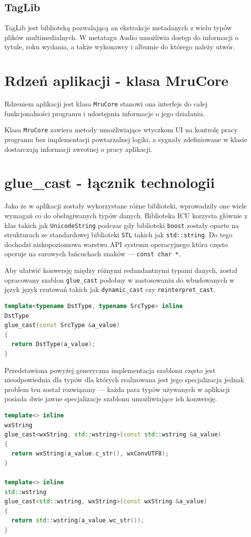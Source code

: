 \subsection{TagLib}
TagLib jest biblioteką pozwalającą an ekstrakcje metadanych z wielu typów plików multimedialnych. W metatagu Audio umożliwia dostęp do informacji o tytule, roku wydania, a także wykonawcy i albumie do którego należy utwór.

\section{Rdzeń aplikacji - klasa MruCore}
Rdzeniem aplikacji jest klasa \texttt{MruCore} stanowi ona interfejs do całej funkcjonalności programu i udostępnia informacje o jego działaniu.
\par
Klasa \texttt{MruCore} zawiera metody umożliwiające wtyczkom UI na kontrolę pracy programu bez implementacji powtarzalnej logiki, a sygnały zdefiniowane w klasie dostarczają informacji zwrotnej o pracy aplikacji.

\section{glue\_cast - łącznik technologii}
Jako że w aplikacji zostały wykorzystane różne biblioteki, wprowadziły one wiele wymagań co do obsługiwanych typów danych.
Biblioteka ICU korzysta głównie z klas takich jak \texttt{UnicodeString} podczas gdy biblioteki \texttt{boost} zostały oparte na strukturach ze standardowej biblioteki \texttt{STL} takich jak \texttt{std::string}. Do tego dochodzi niskopoziomowa warstwa API systemu operacyjnego która często operuje na surowych łańcuchach znaków --- \texttt{const char *}.
\par
Aby ułatwić konwersję między różnymi redundantnymi typami danych, został opracowany szablon \texttt{glue\_cast} podobny w zastosowaniu do wbudowanych w język język rzutowań takich jak \texttt{dynamic\_cast} czy \texttt{reinterpret\_cast}.

\begin{lstlisting}[caption={ glue.hpp}, language=C++]
template<typename DstType, typename SrcType> inline
DstType
glue_cast(const SrcType &a_value)
{
  return DstType(a_value);
}
\end{lstlisting}

\par
Przedstawiona powyżej generyczna implementacja szablonu często jest nieodpowiednia dla typów dla których realizowana jest jego specjalizacja jednak problem ten został rozwiązany --- każda para typów używanych w aplikacji posiada dwie jawne specjalizacje szablonu umożliwiające ich konwersję.
\clearpage
\begin{lstlisting}[caption={ Fragment glue\_impl.hpp --- specjalizacja dla std::wstring i wxString}, language=C++]
template<> inline
wxString
glue_cast<wxString, std::wstring>(const std::wstring &a_value)
{
  return wxString(a_value.c_str(), wxConvUTF8);
}

template<> inline
std::wstring
glue_cast<std::wstring, wxString>(const wxString &a_value)
{
  return std::wstring(a_value.wc_str());
}

\end{lstlisting}

